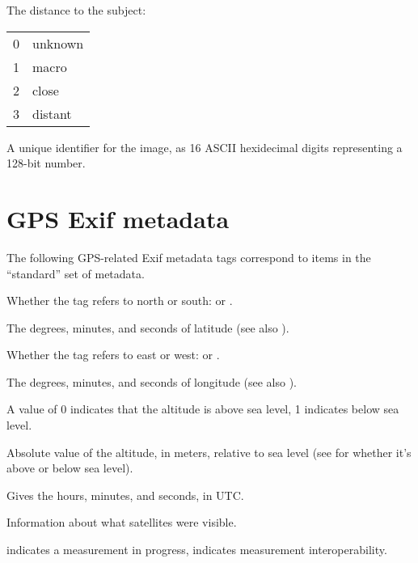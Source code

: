 The distance to the subject:
\smallskip

\begin{tabular}{p{0.3in} p{4in}}
0 & unknown \\
1 & macro \\
2 & close \\
3 & distant
\end{tabular}
\apiend

A unique identifier for the image, as 16 ASCII hexidecimal digits 
representing a 128-bit number.
\apiend


\section{GPS Exif metadata}
\label{sec:metadata:GPS}

The following GPS-related Exif metadata tags correspond to items in the
``standard'' set of metadata.


Whether the  tag refers to north or south:  or 
.
\apiend

The degrees, minutes, and seconds of latitude (see also ).
\apiend

Whether the  tag refers to east or west:  or 
.
\apiend

The degrees, minutes, and seconds of longitude (see also 
).
\apiend

A value of 0 indicates that the altitude is above sea level, 1 indicates
below sea level.
\apiend

Absolute value of the altitude, in meters, relative to sea level 
(see  for whether it's above or below sea level).
\apiend

Gives the hours, minutes, and seconds, in UTC.
\apiend

Information about what satellites were visible.
\apiend

 indicates a measurement in progress,  indicates
measurement interoperability.
\apiend

